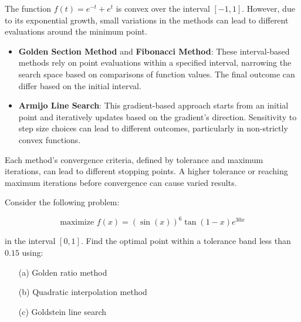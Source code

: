 \documentclass{article}
\begin{document}
The function \( f(t) = e^{-t} + e^{t} \) is convex over the interval \([-1, 1]\). However, due to its exponential growth, small variations in the methods can lead to different evaluations around the minimum point.

\begin{itemize}
   \item \textbf{Golden Section Method} and \textbf{Fibonacci Method}: These interval-based methods rely on point evaluations within a specified interval, narrowing the search space based on comparisons of function values. The final outcome can differ based on the initial interval.
   \item \textbf{Armijo Line Search}: This gradient-based approach starts from an initial point and iteratively updates based on the gradient's direction. Sensitivity to step size choices can lead to different outcomes, particularly in non-strictly convex functions.
\end{itemize}

Each method's convergence criteria, defined by tolerance and maximum iterations, can lead to different stopping points. A higher tolerance or reaching maximum iterations before convergence can cause varied results.

\begin{question*}[7]
Consider the following problem:

\[
\text{maximize } f(x) = (\sin(x))^6 \tan(1 - x) e^{30x}
\]

in the interval \([0, 1]\). Find the optimal point within a tolerance band less than \(0.15\) using:

\begin{itemize}
    \item[(a)] Golden ratio method
    \item[(b)] Quadratic interpolation method
    \item[(c)] Goldstein line search
\end{itemize}
\end{question*}
\end{document}
